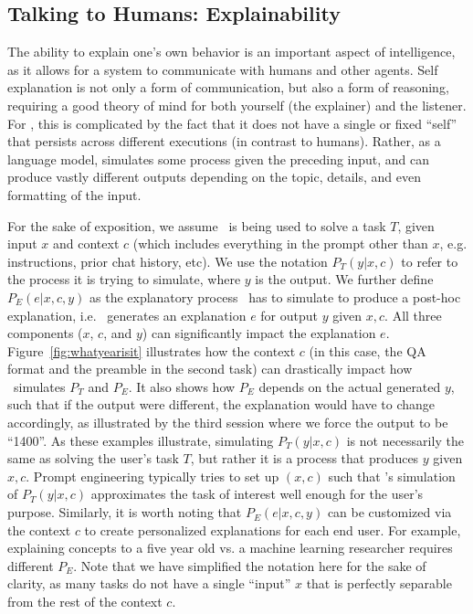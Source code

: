 


\subsection{Talking to Humans: Explainability} \label{sec:explainability}
The ability to explain one's own behavior is an important aspect of intelligence, as it allows for a system to communicate with humans and other agents.
Self explanation is not only a form of communication, but also a form of reasoning, requiring a good theory of mind for both yourself (the explainer) and the listener. 
For {\DV}, this is complicated by the fact that it does not have a single or fixed ``self'' that persists across different executions (in contrast to humans).
Rather, as a language model, {\DV} simulates some process given the preceding input, and can produce vastly different outputs depending on the topic, details, and even formatting of the input.





For the sake of exposition, we assume \DV\ is being used to solve a task $T$, given input $x$ and context $c$ (which includes everything in the prompt other than $x$, e.g. instructions, prior chat history, etc).
We use the notation $P_T(y | x, c)$ to refer to the process it is trying to simulate, where $y$ is the output.
We further define $P_E(e | x, c, y)$ as the explanatory process \DV\ has to simulate to produce a post-hoc explanation,  i.e. \DV\ generates an explanation $e$ for output $y$ given $x, c$. 
All three components ($x$, $c$, and $y$) can significantly impact the explanation $e$. Figure~\ref{fig:whatyearisit} illustrates how the context $c$ (in this case, the QA format and the preamble in the second task) can drastically impact how \DV\ simulates $P_T$ and $P_E$.
It also shows how $P_E$ depends on the actual generated $y$, such that if the output were different, the explanation would have to change accordingly, as illustrated by the third session where we force the output to be ``1400''.
As these examples illustrate, simulating $P_T(y | x, c)$ is not necessarily the same as solving the user's task $T$, but rather it is a process that produces $y$ given $x, c$. Prompt engineering typically tries to set up $(x, c)$ such that {\DV}'s simulation of $P_T(y | x, c)$ approximates the task of interest well enough for the user's purpose. 
Similarly, it is worth noting that $P_E(e | x, c, y)$ can be customized via the context $c$ to create personalized explanations for each end user. For example, explaining concepts to a five year old vs. a machine learning researcher requires different $P_E$.
Note that we have simplified the notation here for the sake of clarity, as many tasks do not have a single ``input'' $x$ that is perfectly separable from the rest of the context $c$.

